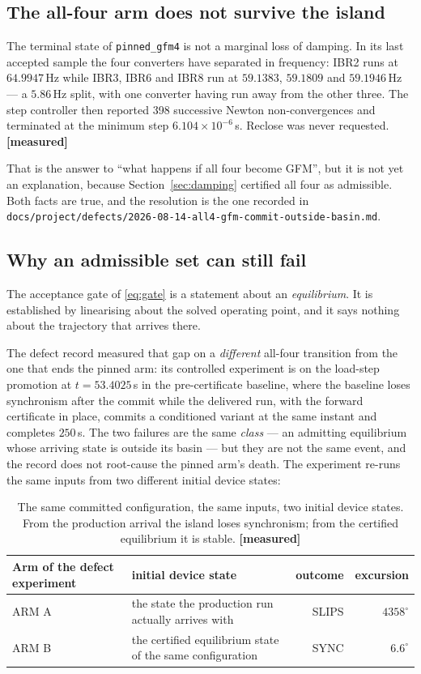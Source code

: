 \documentclass[12pt,a4paper]{article}
\theoremstyle{remark}
\newcommand{\code}[1]{\texttt{\small #1}}
\newcommand{\measured}{\textcolor{ok}{\textbf{[measured]}}}
\begin{document}
\subsection{The all-four arm does not survive the island}

The terminal state of \code{pinned\_gfm4} is not a marginal loss of damping. In
its last accepted sample the four converters have separated in frequency:
IBR2 runs at $64.9947$\,Hz while IBR3, IBR6 and IBR8 run at $59.1383$,
$59.1809$ and $59.1946$\,Hz --- a $5.86$\,Hz split, with one converter having
run away from the other three. The step controller then reported 398 successive
Newton non-convergences and terminated at the minimum step
$6.104\times10^{-6}$\,s. Reclose was never requested. \measured

That is the answer to ``what happens if all four become GFM'', but it is not yet
an explanation, because Section~\ref{sec:damping} certified all four as
admissible. Both facts are true, and the resolution is the one recorded in
\code{docs/project/defects/2026-08-14-all4-gfm-commit-outside-basin.md}.

\subsection{Why an admissible set can still fail}

The acceptance gate of \eqref{eq:gate} is a statement about an
\emph{equilibrium}. It is established by linearising about the solved operating
point, and it says nothing about the trajectory that arrives there.

The defect record measured that gap on a \emph{different} all-four transition
from the one that ends the pinned arm: its controlled experiment is on the
load-step promotion at $t = 53.4025$\,s in the pre-certificate baseline, where
the baseline loses synchronism after the commit while the delivered run, with the
forward certificate in place, commits a conditioned variant at the same instant
and completes $250$\,s. The two failures are the same \emph{class} --- an
admitting equilibrium whose arriving state is outside its basin --- but they are
not the same event, and the record does not root-cause the pinned arm's death.
The experiment re-runs the same inputs from two different initial device states:

\begin{table}[H]
\centering
\small
\begin{tabular}{@{}llrr@{}}
\toprule
\textbf{Arm of the defect experiment} & \textbf{initial device state} & \textbf{outcome} & \textbf{excursion}\\
\midrule
ARM A & the state the production run actually arrives with & SLIPS & $4358^{\circ}$\\
ARM B & the certified equilibrium state of the same configuration & SYNC & $6.6^{\circ}$\\
\bottomrule
\end{tabular}
\caption{The same committed configuration, the same inputs, two initial device
states. From the production arrival the island loses synchronism; from the
certified equilibrium it is stable. \measured}
\label{tab:arm}
\end{table}
\end{document}
